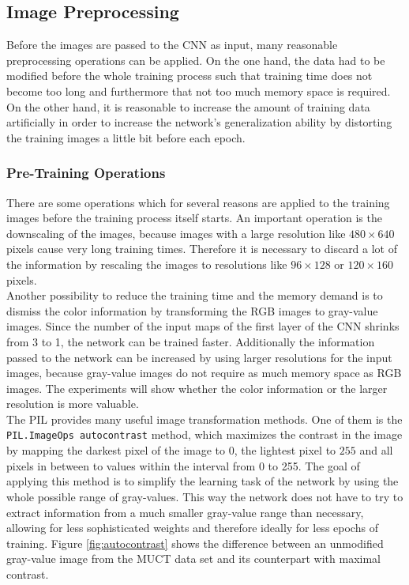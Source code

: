 \documentclass[11pt, a4paper]{article}
\begin{document}
\subsection{Image Preprocessing}
\label{subsec:image_preprocessing}

Before the images are passed to the \ac{CNN} as input, many reasonable preprocessing operations can be applied. On the one hand, the data had to be modified before the whole training process such that training time does not become too long and furthermore that not too much memory space is required. On the other hand, it is reasonable to increase the amount of training data artificially in order to increase the network's generalization ability by distorting the training images a little bit before each epoch.

\subsubsection{Pre-Training Operations}

There are some operations which for several reasons are applied to the training images before the training process itself starts. An important operation is the downscaling of the images, because images with a large resolution like $480\times 640$ pixels cause very long training times. Therefore it is necessary to discard a lot of the information by rescaling the images to resolutions like $96\times 128$ or $120\times 160$ pixels.\\
Another possibility to reduce the training time and the memory demand is to dismiss the color information by transforming the \ac{RGB} images to gray-value images. Since the number of the input maps of the first layer of the \ac{CNN} shrinks from 3 to 1, the network can be trained faster. Additionally the information passed to the network can be increased by using larger resolutions for the input images, because gray-value images do not require as much memory space as \ac{RGB} images. The experiments will show whether the color information or the larger resolution is more valuable.\\
The \ac{PIL} provides many useful image transformation methods. One of them is the \texttt{PIL.ImageOps autocontrast} method, which maximizes the contrast in the image by mapping the darkest pixel of the image to $0$, the lightest pixel to $255$ and all pixels in between to values within the interval from 0 to 255. The goal of applying this method is to simplify the learning task of the network by using the whole possible range of gray-values. This way the network does not have to try to extract information from a much smaller gray-value range than necessary, allowing for less sophisticated weights and therefore ideally for less epochs of training. Figure \ref{fig:autocontrast} shows the difference between an unmodified gray-value image from the \ac{MUCT} data set and its counterpart with maximal contrast.
\end{document}
